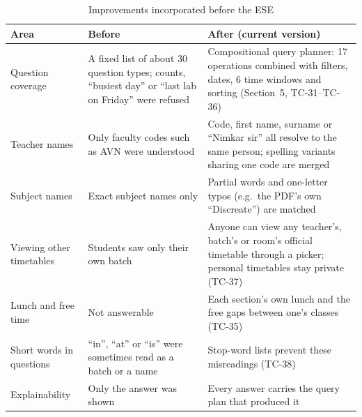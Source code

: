 \begin{table}[H]
\centering
\caption{Improvements incorporated before the ESE}
\label{tab:improvements}
\small
\begin{tabularx}{\textwidth}{@{}p{3.6cm}XX@{}}
\toprule
\textbf{Area} & \textbf{Before} & \textbf{After (current version)}\\
\midrule
Question coverage & A fixed list of about 30 question types; counts, ``busiest day'' or ``last lab on Friday'' were refused & Compositional query planner: 17 operations combined with filters, dates, 6 time windows and sorting (Section~5, TC-31--TC-36)\\
Teacher names & Only faculty codes such as AVN were understood & Code, first name, surname or ``Nimkar sir'' all resolve to the same person; spelling variants sharing one code are merged\\
Subject names & Exact subject names only & Partial words and one-letter typos (e.g.\ the PDF's own ``Discreate'') are matched\\
Viewing other timetables & Students saw only their own batch & Anyone can view any teacher's, batch's or room's official timetable through a picker; personal timetables stay private (TC-37)\\
Lunch and free time & Not answerable & Each section's own lunch and the free gaps between one's classes (TC-35)\\
Short words in questions & ``in'', ``at'' or ``is'' were sometimes read as a batch or a name & Stop-word lists prevent these misreadings (TC-38)\\
Explainability & Only the answer was shown & Every answer carries the query plan that produced it\\
\bottomrule
\end{tabularx}
\end{table}
